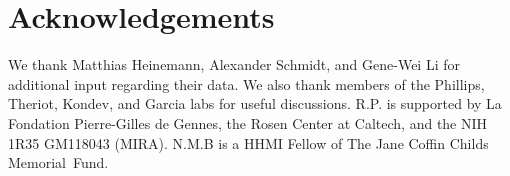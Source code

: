 \section{Acknowledgements}
We thank Matthias Heinemann, Alexander Schmidt, and Gene-Wei Li for additional
input regarding their data. We also thank members of the Phillips, Theriot,
Kondev, and Garcia labs for useful discussions. R.P. is supported by La
Fondation Pierre-Gilles de Gennes, the Rosen Center at Caltech, and the NIH 1R35
GM118043 (MIRA). N.M.B is a HHMI Fellow of The Jane Coffin Childs Memorial Fund.
